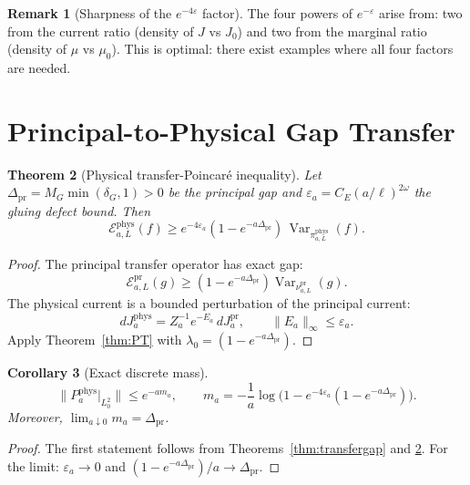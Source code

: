 \documentclass[12pt]{article}
\theoremstyle{plain}
\newtheorem{theorem}{Theorem}[section]
\newtheorem{corollary}[theorem]{Corollary}
\theoremstyle{definition}
\newtheorem{remark}[theorem]{Remark}
\numberwithin{equation}{section}
\newcommand{\Var}{\operatorname{Var}}
\newcommand{\pr}{\mathrm{pr}}
\newcommand{\phys}{\mathrm{phys}}
\begin{document}
\begin{remark}[Sharpness of the $e^{-4\varepsilon}$ factor]
The four powers of $e^{-\varepsilon}$ arise from: two from the current ratio (density of $J$ vs $J_0$) and two from the marginal ratio (density of $\mu$ vs $\mu_0$).  This is optimal: there exist examples where all four factors are needed.
\end{remark}

\section{Principal-to-Physical Gap Transfer}\label{sec:gaptransfer}

\begin{theorem}[Physical transfer-Poincar\'e inequality]\label{thm:physicalPoincare}
Let $\Delta_{\pr}=M_G\min(\delta_G,1)>0$ be the principal gap and $\varepsilon_a=C_E(a/\ell)^{2\omega}$ the gluing defect bound.  Then
\begin{equation}
\boxed{\mathcal{E}_{a,L}^{\phys}(f) \geq e^{-4\varepsilon_a}(1-e^{-a\Delta_{\pr}})\,\Var_{\pi_{a,L}^{\phys}}(f).}
\end{equation}
\end{theorem}

\begin{proof}
The principal transfer operator has exact gap:
\begin{equation}
\mathcal{E}_{a,L}^{\pr}(g) \geq (1-e^{-a\Delta_{\pr}})\Var_{\nu_{a,L}^{\pr}}(g).
\end{equation}
The physical current is a bounded perturbation of the principal current:
\begin{equation}
dJ_a^{\phys} = Z_a^{-1}e^{-E_a}\,dJ_a^{\pr},\qquad \|E_a\|_\infty\leq\varepsilon_a.
\end{equation}
Apply Theorem~\ref{thm:PT} with $\lambda_0=(1-e^{-a\Delta_{\pr}})$.
\end{proof}

\begin{corollary}[Exact discrete mass]\label{cor:discretemass}
\begin{equation}
\|P_a^{\phys}|_{L^2_0}\| \leq e^{-am_a},\qquad
m_a = -\frac{1}{a}\log\bigl(1-e^{-4\varepsilon_a}(1-e^{-a\Delta_{\pr}})\bigr).
\end{equation}
Moreover, $\lim_{a\downarrow 0}m_a = \Delta_{\pr}$.
\end{corollary}

\begin{proof}
The first statement follows from Theorems~\ref{thm:transfergap} and \ref{thm:physicalPoincare}.  For the limit: $\varepsilon_a\to 0$ and $(1-e^{-a\Delta_{\pr}})/a\to\Delta_{\pr}$.
\end{proof}
\end{document}
